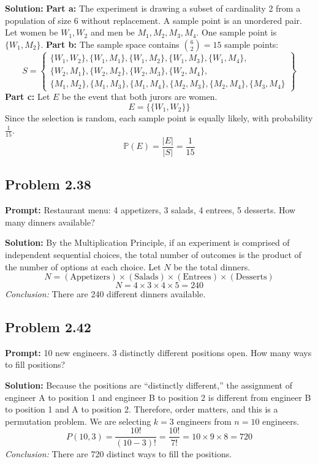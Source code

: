 \documentclass[11pt, letterpaper]{article}
\theoremstyle{definition}
\theoremstyle{remark}
\newcommand{\Prob}{\mathbb{P}}
\begin{document}
\textbf{Solution:}
\textbf{Part a:} The experiment is drawing a subset of cardinality 2 from a population of size 6 without replacement. A sample point is an unordered pair. Let women be $W_{1}, W_{2}$ and men be $M_{1}, M_{2}, M_{3}, M_{4}$. One sample point is $\{W_{1}, M_{2}\}$.
\textbf{Part b:} The sample space contains $\binom{6}{2} = 15$ sample points:
\[ S = \left\{ \begin{array}{l} \{W_{1},W_{2}\}, \{W_{1},M_{1}\}, \{W_{1},M_{2}\}, \{W_{1},M_{3}\}, \{W_{1},M_{4}\}, \\ \{W_{2},M_{1}\}, \{W_{2},M_{2}\}, \{W_{2},M_{3}\}, \{W_{2},M_{4}\}, \\ \{M_{1},M_{2}\}, \{M_{1},M_{3}\}, \{M_{1},M_{4}\}, \{M_{2},M_{3}\}, \{M_{2},M_{4}\}, \{M_{3},M_{4}\} \end{array} \right\} \]
\textbf{Part c:} Let $E$ be the event that both jurors are women.
\[ E = \{\{W_{1}, W_{2}\}\} \]
Since the selection is random, each sample point is equally likely, with probability $\frac{1}{15}$.
\[ \Prob(E) = \frac{|E|}{|S|} = \frac{1}{15} \]

\subsection*{Problem 2.38}
\textbf{Prompt:} Restaurant menu: 4 appetizers, 3 salads, 4 entrees, 5 desserts. How many dinners available?

\textbf{Solution:}
By the Multiplication Principle, if an experiment is comprised of independent sequential choices, the total number of outcomes is the product of the number of options at each choice. Let $N$ be the total dinners.
\[ N = (\text{Appetizers}) \times (\text{Salads}) \times (\text{Entrees}) \times (\text{Desserts}) \]
\[ N = 4 \times 3 \times 4 \times 5 = 240 \]
\textit{Conclusion:} There are 240 different dinners available.

\subsection*{Problem 2.42}
\textbf{Prompt:} 10 new engineers. 3 distinctly different positions open. How many ways to fill positions?

\textbf{Solution:}
Because the positions are ``distinctly different,'' the assignment of engineer A to position 1 and engineer B to position 2 is different from engineer B to position 1 and A to position 2. Therefore, order matters, and this is a permutation problem. We are selecting $k=3$ engineers from $n=10$ engineers.
\[ P(10, 3) = \frac{10!}{(10-3)!} = \frac{10!}{7!} = 10 \times 9 \times 8 = 720 \]
\textit{Conclusion:} There are 720 distinct ways to fill the positions.
\end{document}
